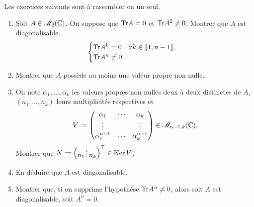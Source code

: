 Les exercices suivants sont à rassembler en un seul.

\begin{exercice}
    \begin{enumerate}
        \item Soit $A \in \mathscr{M}_2(\mathbb{C})$. On suppose que $\mathrm{Tr}{A} = 0$ et $\mathrm{Tr}{A}^2 \not=0$. Montrer que $A$ est diagonalisable. \\
        $$
        \begin{cases}
            \mathrm{Tr}{A^k}= 0 \quad \forall k \in \llbracket 1, n-1 \rrbracket, \\
            \mathrm{Tr}{A^n}\not=0.
        \end{cases}
        $$
        \item Montrer que $A$ possède au moins une valeur propre non nulle. 
        \item On note $\alpha_1, \dots, \alpha_k$ les valeurs propres non nulles deux à deux distinctes de $A$, $(n_1, \dots, n_k)$ leurs multiplicités respectives et 
        $$
        V \defeq \begin{pmatrix}
            \alpha_1 & \cdots & \alpha_k \\
            \vdots & & \vdots \\
            \alpha_1^{n-1} & \cdots & \alpha_k^{n-1}
        \end{pmatrix}
        \in \M_{n-1,k}(\C).
        $$
        Montrer que $N \defeq \Trsp{\begin{pmatrix} n_1  \vdots n_k \end{pmatrix}} \in \Ker{V}$.
        \item En déduire que $A$ est diagonalisable.
        \item Montrer que, si on supprime l'hypothèse $\mathrm{Tr}{A^n} \not=0$, alors soit $A$ est diagonalisable, soit $A^n = 0$.
    \end{enumerate}
\end{exercice}

\newcommand{\vandermondepartiel}{
\left(\begin{gathered}
    \tikzpicture[every node/.style={anchor=south west}]
        \node[minimum width=1.5cm,minimum height=0.5cm] at (0.125,1.25) {\LARGE $V_k$};
        
        \node[minimum width=0.5cm,minimum height=0.5cm] at (0,0) {$\star$};
        \node[minimum width=0.5cm,minimum height=0.5cm] at (0.55,0) {$\cdots$};
        \node[minimum width=0.5cm,minimum height=0.5cm] at (1.25,0) {$\star$};
        
        \node[minimum width=0.5cm,minimum height=0.5cm] at (0,0.375) {$\vdots$};
        \node[minimum width=0.5cm,minimum height=0.5cm] at (1.25,0.375) {$\vdots$};
        
        \node[minimum width=0.5cm,minimum height=0.5cm] at (0,0.75) {$\star$};
        \node[minimum width=0.5cm,minimum height=0.5cm] at (0.55,0.75) {$\cdots$};
        \node[minimum width=0.5cm,minimum height=0.5cm] at (1.25,0.75) {$\star$};

        \draw (0, 1.25) -- (1.75, 1.25);
    \endtikzpicture
    \end{gathered}\right)
}

